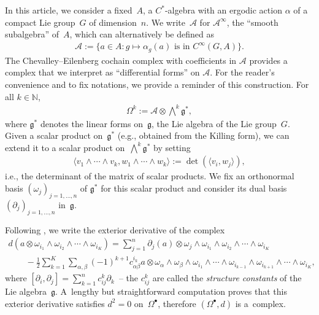\documentclass[pdftex]{sigma}
\newcommand{\Aa}{\mathcal{A}}
\newcommand{\LieG}{\mathfrak{g}}
\newcommand{\N}{\mathbb{N}}
\numberwithin{equation}{section}
\begin{document}
In this article, we consider a f\/ixed~$A$, a $C^*$-algebra with an ergodic action $\alpha$ of a compact Lie group~$G$ of dimension~$n$. We write~$\Aa$ for $\Aa^\infty$, the ``smooth subalgebra'' of~$A$, which can alternatively be def\/ined as
\begin{gather*}
\Aa := \{ a \in A \colon g \mapsto \alpha_g(a) \text{ is in }C^\infty (G, A) \}.
\end{gather*}
The Chevalley--Eilenberg cochain complex with coef\/f\/icients in $\Aa$ provides a complex that we interpret as ``dif\/ferential forms'' on $\Aa$. For the reader's convenience and to f\/ix notations, we provide a reminder of this construction. For all $k \in \N$,
\begin{gather*}
\Omega^k := \Aa \otimes \bigwedge^k \LieG^*,
\end{gather*}
where $\LieG^*$ denotes the linear forms on~$\LieG$, the Lie algebra of the Lie group~$G$. Given a scalar product on~$\LieG^*$ (e.g., obtained from the Killing form), we can extend it to a scalar product on~$\bigwedge^k \LieG^*$ by setting
\begin{gather*}
\langle v_1 \wedge \cdots \wedge v_k, w_1 \wedge \cdots \wedge w_k \rangle := \det( \langle v_i, w_j \rangle ),
\end{gather*}
i.e., the determinant of the matrix of scalar products. We f\/ix an orthonormal basis $(\omega_j)_{j = 1, \ldots , n}$ of $\LieG^*$ for this scalar product and consider its dual basis $(\partial _j)_{j=1, \ldots , n}$ in~$\LieG$.

Following \cite[the model of~(4.6), p.~157]{KnappLieGp}, we write the exterior derivative of the complex
\begin{gather}
d( a \otimes \omega_{i_1} \wedge \omega_{i_2} \wedge \cdots \wedge \omega_{i_K} ) =\sum_{j = 1}^n \partial _j(a) \otimes \omega_j \wedge \omega_{i_1} \wedge \omega_{i_2} \wedge \cdots \wedge \omega_{i_K} \nonumber\\
\qquad{}
 - \frac{1}{2} \sum_{k=1}^K \sum_{\alpha, \beta} (-1)^{k+1} c^{i_k}_{\alpha \beta} a \otimes \omega_\alpha \wedge \omega_\beta \wedge \omega_{i_1} \wedge \cdots \wedge \omega_{i_{k-1}} \wedge \omega_{i_{k+1}} \wedge \cdots \wedge \omega_{i_K},\label{Eqn:Defd}
\end{gather}
where $[\partial _i, \partial _j] = \sum\limits_{k=1}^n c^k_{i j} \partial _k$~-- the $c^{k}_{i j}$ are called the \emph{structure constants} of the Lie algebra~$\LieG$. A~lengthy but straightforward computation proves that this exterior derivative satisf\/ies $d^2 = 0$ on~$\Omega^\bullet$, therefore $(\Omega^\bullet , d)$ is a~complex.
\end{document}
